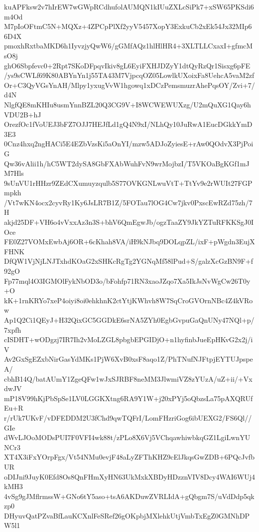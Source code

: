 kuAPFksw2v7hIrEW7wGWpRCdhufolAUMQN1kIUuZXLcSiPk7+xSW65PKSdi6m4Od
M7pIoOFtmC5N+MQXz+4ZPCpPlXf2yyV5457XopY3ExkuCb2xEk54Jx32MIp66D4X
pmoxhRxtbaMKD6h1IyvzjyQwW6/gGMfAQz1hlHlHR4+3XLTLLCxaxI+gfmcMsO8j
ghO6Sbpfevc0+2Rpt7SKoDFpqvIkiv8gL6EyiFXHJDZyY1dtQyRzQr1Sisxg6pFE
/ys9sCWLf69K80ABYnYn1j55TA43M7VjpcqOZ05LowlkUXoixFa8UehcA5vaM2zf
Or+C3QyVGsYnAH/Mlpy1yxugVvW1hgowq1xDCzPemsmuzrAhePqsOY/Zvi+7/d4N
NlgfQE8mKHIu8usmYnnBZL20Q3CG9V+I8WCWEWUXzg/U2mQuXG1Qay6hVDU2B+hJ
OrezfOc1fVoUEJ3bFZ7OJJ7HEJfLd1gQ4N9xI/NLhQy10JuRwA1EucDGkkYmD3E3
0Cnz4hxq2ngHACi5E4EZbVzsKi5aOnYI/mzw5ADJoZyiesE+rAw0QOdvX3PjPoiG
Qw36vAlii1h/hC5WT2dySA8GbFXAbWuhFvN9wrMojbzI/T5VKOaBgKGf1mJM7Hls
9sUnVU1rHHzr9ZEdCXumuyzqulb5S77OVKGNLwuVtT+TtYv9e2rWUIt27FGPmpkh
/Vt7wKN4ocx2cyvRy1Ky6JsLR7B1Z/5FOTau7lOG4Cw7jkv0PxscEwRZd75zh/7H
akjd25DF+VH6o4vVxxAz3n3S+bhV6QmEgwJb/ogzTaaZY9JkYZTuRFKKSgJ0IOce
FE0Z27VOMxEwbAj6OR+6cKhah8VA/iH9kNJbq9DOLqpZL/ixF+pWgdn3EujXFHNK
DfQW1VjNjLNJTxhdKOaG2xSHKcRgTg2YGNqMf58lPud+S/galzXcGzBN9F+f92gO
Fp77mql4O3IGMOlFykNbOD3o/bFohfp71RN3xaoJZqo7Xa5IkJsNvWgCw26T0y+O
kK+1rnKRYo7xeP4oiyi8oi0ehkhnK2ctYtjKWhvh8W7SqCroGVOrnNBc4Z4kVRow
Ap1Q2Ci1QEyJ+H32QixGC5GGDkE6srNA5ZYh0EgbGvpuGaQnUNy47NQl+p/7xpfh
cISDHT+wODgzj7IR7Ih2vMoLZGL8pbgbEPGIDjO+n1hyfinbJueEpHKvG2x2j/iV
Av2GxSgEZxbNirGasYdMKs1PjW6XvB0xsF8aqo1Z/PhTNufNJFtpjEYTUJpspeA/
cbhB14Q/batAUmY1ZgeQFw1wJxSJRBF8neMM3JlwmiVZ8zYUzA/uZ+ii/+VxdwJV
mP18V99hKjPbSpSe1LV0LGGKXtng6RA9Y1W+j20xPYj5oQbzsLa75pAXQRUfEu+R
r/rUk7UKvF/vDFEDDM2U3fChd9qwTQFrI/LomFHzriGog6ibUEXG2/FS6Ql//GIe
dWvLJOoMODsPUI7F0VFI4wk88t/zPLo8X6Vj5VChqawhiwbkqGZ1LgiLwnYUNCr3
XT4X3iFxYOrpFgx/Vt54NMu0evjF48aLyZFThKHZ9cElJkqsGwZDB+6PQcJvfbUR
oDIJni9JuyK0Efd8Os8QnFHmXyHN63UkMxkXBDyHDzznVIV8Dcy4WAI6WUj4kMH3
4vSg9gJMflrmssW+GNo6tY5aso+tsA6AKDuwZVRLIdA+gQbgm7S/uVdDdp5qkzp0
DHyuvQatPZvaBfLauKCXnlFeSRef26gOKpbjMXlehkUtjVmbTxEgZ0GMNhDPW5l1
